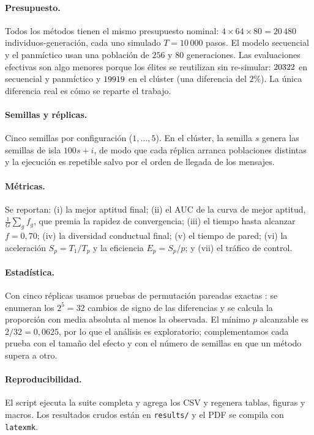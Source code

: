 \documentclass[11pt,a4paper]{article}
\begin{document}
\paragraph{Presupuesto.}
Todos los m\'etodos tienen el mismo presupuesto nominal: $4\times64\times80
=20\,480$ individuos-generaci\'on, cada uno simulado $T=10\,000$ pasos.  El
modelo secuencial y el panm\'ictico usan una poblaci\'on de $256$ y $80$
generaciones.  Las evaluaciones efectivas son algo menores porque los \'elites
se reutilizan sin re-simular: $20322$ en secuencial y panm\'ictico y
$19919$ en el cl\'uster (una diferencia del $2\%$).  La \'unica diferencia
real es c\'omo se reparte el trabajo.

\paragraph{Semillas y r\'eplicas.}
Cinco semillas por configuraci\'on ($1,\dots,5$).  En el cl\'uster, la semilla
$s$ genera las semillas de isla $100s+i$, de modo que cada r\'eplica arranca
poblaciones distintas y la ejecuci\'on es repetible salvo por el orden de
llegada de los mensajes.

\paragraph{M\'etricas.}
Se reportan: (i) la mejor aptitud final; (ii) el AUC de la curva de mejor
aptitud, $\frac{1}{G}\sum_g f_g$, que premia la rapidez de convergencia; (iii) el
tiempo hasta alcanzar $f=0{,}70$; (iv) la diversidad conductual final; (v) el
tiempo de pared; (vi) la aceleraci\'on $S_p=T_1/T_p$ y la eficiencia
$E_p=S_p/p$; y (vii) el tr\'afico de control.

\paragraph{Estad\'istica.}
Con cinco r\'eplicas usamos pruebas de permutaci\'on pareadas exactas
\citep{good2005}: se enumeran los $2^{5}=32$ cambios de signo de las diferencias
y se calcula la proporci\'on con media absoluta al menos la observada.  El
m\'inimo $p$ alcanzable es $2/32=0{,}0625$, por lo que el an\'alisis es
exploratorio; complementamos cada prueba con el tama\~no del efecto y con el
n\'umero de semillas en que un m\'etodo supera a otro.

\paragraph{Reproducibilidad.}
{\sloppy
El script  ejecuta la suite completa y
 agrega los CSV y regenera tablas, figuras y
macros.  Los resultados crudos est\'an en \texttt{results/} y el PDF se compila
con \texttt{latexmk}.\par}
\end{document}
